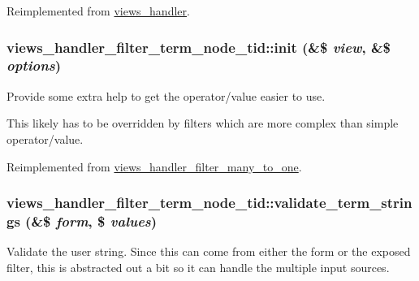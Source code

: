 Reimplemented from \hyperlink{classviews__handler_a10d35469346efc352d21e5f44de60b2e}{views\_\-handler}.\hypertarget{classviews__handler__filter__term__node__tid_ab4f316cfbf968a2faa8e574b9df5c4f3}{
\subsubsection[{init}]{\setlength{\rightskip}{0pt plus 5cm}views\_\-handler\_\-filter\_\-term\_\-node\_\-tid::init (\&\$ {\em view}, \/  \&\$ {\em options})}}
\label{classviews__handler__filter__term__node__tid_ab4f316cfbf968a2faa8e574b9df5c4f3}
Provide some extra help to get the operator/value easier to use.

This likely has to be overridden by filters which are more complex than simple operator/value. 

Reimplemented from \hyperlink{classviews__handler__filter__many__to__one_aecb4fb4dbe4f93d157cb8a7b699fea22}{views\_\-handler\_\-filter\_\-many\_\-to\_\-one}.\hypertarget{classviews__handler__filter__term__node__tid_a762ab62bf1d1431daedea8f5d344bba4}{
\subsubsection[{validate\_\-term\_\-strings}]{\setlength{\rightskip}{0pt plus 5cm}views\_\-handler\_\-filter\_\-term\_\-node\_\-tid::validate\_\-term\_\-strings (\&\$ {\em form}, \/  \$ {\em values})}}
\label{classviews__handler__filter__term__node__tid_a762ab62bf1d1431daedea8f5d344bba4}
Validate the user string. Since this can come from either the form or the exposed filter, this is abstracted out a bit so it can handle the multiple input sources.


